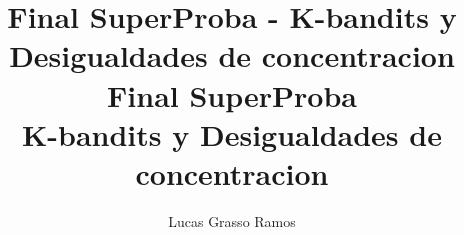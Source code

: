 \documentclass{article}
\title{Final SuperProba - K-bandits y Desigualdades de concentracion}
\title{%
  Final SuperProba \\
  \large K-bandits y Desigualdades de concentracion
}
\author{Lucas Grasso Ramos}
\begin{document}
\maketitle










\medskip


\end{document}
